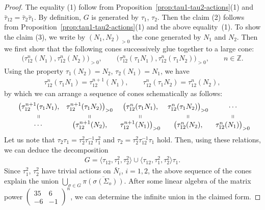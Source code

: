 \documentclass[pdftex]{sigma}
\numberwithin{equation}{section}
\begin{document}
\begin{proof} The equality (1) follow from Proposition~\ref{prop:tau1-tau2-actions}(1) and $\bar{\tau}_{12}=\bar{\tau}_{2}\bar{\tau}_{1}$. By definition, $G$ is generated by $\tau_{1}$, $\tau_{2}$. Then the claim (2) follows from Proposition~\ref{prop:tau1-tau2-actions}(1) and the above equality~(1). To show the claim (3), we write by $(N_{1},N_{2})_{>0}$ the cone generated by $N_{1}$ and $N_{2}$. Then we first show that
the following cones successively glue together to a large cone:
\begin{gather*}
\big(\tau_{12}^{n}(N_{1}),\tau_{12}^{n}(N_{2})\big)_{>0},\qquad \big(\tau_{12}^{n}(\tau_{1}N_{1}),\tau_{12}^{n}(\tau_{1}N_{2})\big)_{>0}, \qquad n\in\mathbb{Z}.
\end{gather*}
Using the property $\tau_{1}(N_{2})=N_{2}$, $\tau_{2}(N_{1})=N_{1}$, we have
\begin{gather*}
\tau_{12}^{n}(\tau_{1}N_{1})=\tau_{12}^{n+1}(N_{1}),\qquad \tau_{12}^{n}(\tau_{1}N_{2})=\tau_{12}^{n}(N_{2}),
\end{gather*}
by which we can arrange a sequence of cones schematically as follows:
\begin{gather*}
\begin{array}{@{}ccccccc}
 & \big(\tau_{12}^{n+1}(\tau_{1}N_{1}), & \tau_{12}^{n+1}(\tau_{1}N_{2})\big)_{>0} & \big(\tau_{12}^{n}(\tau_{1}N_{1}), & \tau_{12}^{n}(\tau_{1}N_{2})\big)_{>0} & \cdots\\
 & \shortparallel & \shortparallel & \shortparallel & \shortparallel & \shortparallel\\
 & \cdots & \big(\tau_{12}^{n+1}(N_{2}), & \tau_{12}^{n+1}(N_{1})\big)_{>0} & \big(\tau_{12}^{n}(N_{2}), & \tau_{12}^{n}(N_{1})\big)_{>0}
\end{array}
\end{gather*}
Let us note that $\tau_{2}\tau_{1}=\tau_{2}^{2}\tau_{12}^{-1}\tau_{1}^{2}$ and $\tau_{2}=\tau_{2}^{2}\tau_{12}^{-1}\tau_{1}$ hold. Then, using these relations, we can deduce the decomposition
\begin{gather*}
G=\big\langle\tau_{12},\tau_{1}^{2},\tau_{2}^{2}\big\rangle\cup\big\langle\tau_{12},\tau_{1}^{2},\tau_{2}^{2}\big\rangle\tau_{1}.
\end{gather*}
Since $\tau_{1}^{2}$, $\tau_{2}^{2}$ have trivial actions on $\bar{N}_{i}$, $i=1,2$, the above sequence of the cones explain the union $\bigcup_{\sigma\in G}\overline{\pi(\sigma(\Sigma_{o}))}$. After some linear algebra of the matrix power $\left(\begin{smallmatrix}35 & 6\\
-6 & -1
\end{smallmatrix}\right)^{n}$, we can determine the infinite union in the claimed form.
\end{proof}
\end{document}
